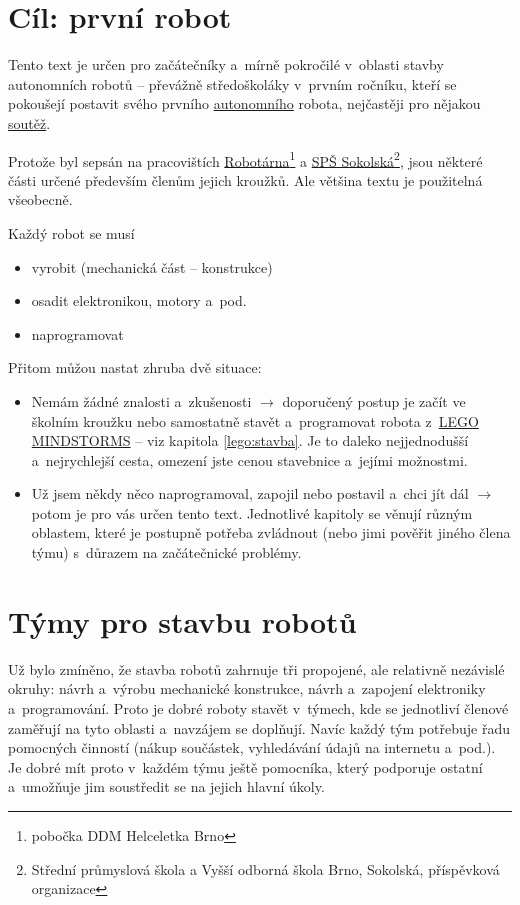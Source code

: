 \section{Cíl: první robot}


Tento text je určen pro začátečníky a~mírně pokročilé v~oblasti stavby autonomních robotů -- převážně středoškoláky v~prvním ročníku, kteří se pokoušejí postavit svého prvního \hyperref[autonomni]{autonomního}
robota, nejčastěji pro nějakou \hyperref[prehled_soutezi]{soutěž}.

Protože byl sepsán na pracovištích \href{http://www.helceletka.cz/robotarna}{Robotárna}\footnote{pobočka DDM Helceletka Brno}  a 
 \href{http://www.sokolska.cz/}{SPŠ Sokolská}\footnote{Střední průmyslová škola a Vyšší odborná škola Brno, Sokolská, příspěvková organizace},
 jsou některé části určené především členům jejich kroužků. Ale většina textu je použitelná všeobecně.

Každý robot se musí 
\begin{itemize} 	%
\item vyrobit (mechanická část -- konstrukce)
\item osadit elektronikou, motory a~pod.
\item naprogramovat 
\end{itemize}

Přitom můžou nastat zhruba dvě situace:

\begin{itemize} %
\item  Nemám žádné znalosti a~zkušenosti $\rightarrow$ doporučený 
postup je začít ve školním kroužku nebo samostatně stavět a~programovat 
robota z~\href{https://www.lego.com/cs-cz/mindstorms}{LEGO MINDSTORMS} -- viz kapitola \ref{lego:stavba}. 
Je to daleko nejjednodušší a~nejrychlejší cesta, omezení jste cenou stavebnice a~jejími možnostmi.
\item  Už jsem někdy něco naprogramoval, zapojil nebo postavil a~chci jít dál $\rightarrow$ potom je pro vás určen tento text.
Jednotlivé kapitoly se věnují různým oblastem, které je postupně potřeba zvládnout (nebo jimi pověřit jiného člena týmu) s~důrazem na začátečnické problémy.
\end{itemize}

\section{Týmy pro stavbu robotů}

Už bylo zmíněno, že stavba robotů zahrnuje tři propojené, 
ale relativně nezávislé okruhy: návrh a~výrobu mechanické konstrukce, 
návrh a~zapojení elektroniky a~programování.
Proto je dobré roboty stavět v~týmech, kde se jednotliví členové zaměřují na tyto oblasti a~navzájem se doplňují.
Navíc každý tým potřebuje řadu pomocných činností (nákup součástek, vyhledávání údajů na internetu a~pod.).
Je dobré mít proto v~každém týmu ještě pomocníka, který podporuje ostatní a~umožňuje jim soustředit se na jejich hlavní úkoly.

